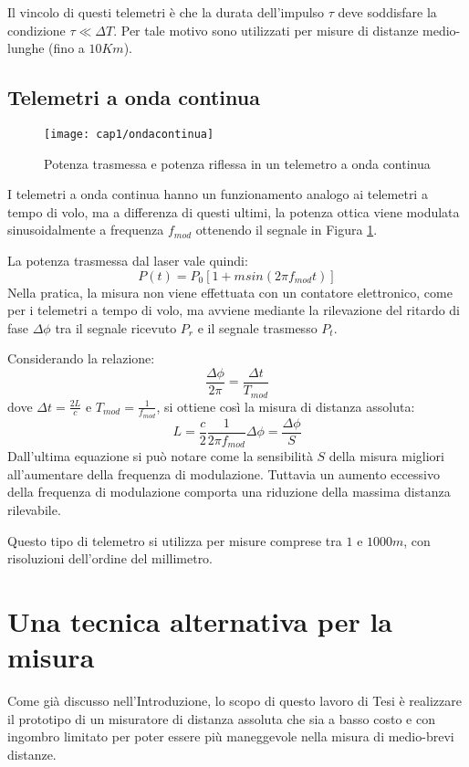 Il vincolo di questi telemetri è che la durata dell'impulso $\tau$ deve soddisfare la condizione $\tau \ll \Delta T$. Per tale motivo sono utilizzati per misure di distanze medio-lunghe (fino a $10 Km$). 

\subsection{Telemetri a onda continua}
\begin{figure}[H]
  \begin{center}
    \texttt{[image: cap1/ondacontinua]}
    \caption{Potenza trasmessa e potenza riflessa in un telemetro a onda continua}
    \label{ondacontinua}
  \end{center}
\end{figure}
I telemetri a onda continua hanno un funzionamento analogo ai telemetri a tempo di volo, ma a differenza di questi ultimi, la potenza ottica viene modulata sinusoidalmente a frequenza $f_{mod}$ ottenendo il segnale in Figura \ref{ondacontinua}.

La potenza trasmessa dal laser vale quindi:
\begin{equation}
	 P(t)=P_0[1+msin(2\pi f_{mod}t)]
\end{equation} 
Nella pratica, la misura non viene effettuata con un contatore elettronico, come per i telemetri a tempo di volo, ma avviene mediante la rilevazione del ritardo di fase $\Delta\phi$ tra il segnale ricevuto $P_r$ e il segnale trasmesso $P_t$.

Considerando la relazione:
\begin{equation}
  \frac{\Delta\phi}{2\pi}=\frac{\Delta t}{T_{mod}}
\end{equation}
dove $\Delta t=\frac{2L}{c}$ e $T_{mod}=\frac{1}{f_{mod}}$, si ottiene così la misura di distanza assoluta:
\begin{equation}
  L=\frac{c}{2}\frac{1}{2\pi f_{mod}}\Delta\phi=\frac{\Delta\phi}{S}
\end{equation}
Dall'ultima equazione si può notare come la sensibilità $S$ della misura migliori all'aumentare della frequenza di modulazione. Tuttavia un aumento eccessivo della frequenza di modulazione comporta una riduzione della massima distanza rilevabile. 

Questo tipo di telemetro si utilizza per misure comprese tra $1$ e $1000m$, con risoluzioni dell'ordine del millimetro. 

\section{Una tecnica alternativa per la misura}
Come già discusso nell'Introduzione, lo scopo di questo lavoro di Tesi è realizzare il prototipo di un misuratore di distanza assoluta che sia a basso costo e con ingombro limitato per poter essere più maneggevole nella misura di medio-brevi distanze.

